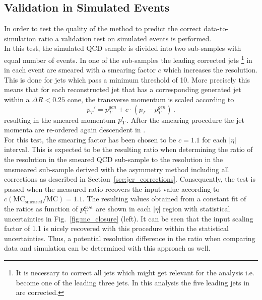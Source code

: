 \subsection{Validation in Simulated Events}
\label{sec:jer_validation_closure}
In order to test the quality of the method to predict the correct data-to-simulation ratio a validation test on simulated events is performed. \\ 
In this test, the simulated \pythia QCD sample is divided into two sub-samples with equal number of events. In one of the sub-samples the leading corrected jets \footnote{It is necessary to correct all jets which might get relevant for the analysis i.e. become one of the leading three jets. In this analysis the five leading jets in \pt are corrected.} in \pt in each event are smeared with a smearing factor $c$ which increases the \pt resolution. This is done for jets which pass a minimum \pt threshold of 10\gev. More precisely this means that for each reconstructed jet that has a corresponding generated jet within a $\Delta R < 0.25$ cone, the transverse momentum is scaled according to
\begin{equation}
 p_{T}' = p^{gen}_{T} + c \cdot (p_{T} - p^{gen}_{T}) \, .
\label{eq:smear_gen}
\end{equation} 
resulting in the smeared momentum $p_{\text{T}}'$. After the smearing procedure the jet momenta are re-ordered again descendent in \pt.\\
For this test, the smearing factor has been chosen to be $c = 1.1$ for each $|\eta|$ interval. This is expected to be the resulting ratio when determining the ratio of the resolution in the smeared QCD sub-sample to the resolution in the unsmeared sub-sample derived with the asymmetry method including all corrections as described in Section~\ref{sec:jer_corrections}. Consequently, the test is passed when the measured ratio recovers the input value according to $c\mathrm{(MC_{smeared}/MC)} = 1.1$. The resulting values obtained from a constant fit of the ratios as function of $p_{\text{T}}^{ave}$ are shown in each $|\eta|$ region with statistical uncertainties in Fig.~\ref{fig:mc_closure} (left). It can be seen that the input scaling factor of 1.1 is nicely recovered with this procedure within the statistical uncertainties. Thus, a potential resolution difference in the ratio when comparing data and simulation can be determined with this approach as well.

